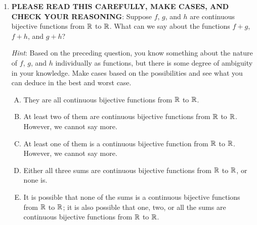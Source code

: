 \documentclass[10pt]{amsart}
\begin{document}
\begin{enumerate}
  \begin{enumerate}[(A)]
  \item $f$ must be an increasing function on all of $\R$.
  \item $f$ must be a decreasing function on all of $\R$.
  \item $f$ must be a constant function on all of $\R$.
  \item $f$ must be either an increasing function on all of $\R$ or a
    decreasing function on all of $\R$, but the information presented
    is insufficient to decide which case occurs.
  \item $f$ must be either an increasing function or a decreasing
    function or a constant function on all of $\R$, but the
    information presented is insufficient for deciding anything
    stronger.
  \end{enumerate}

  {\em Answer}: Option (D)

  {\em Explanation}: This is easy to see pictorially, though a
  rigorous proof would invoke the intermediate value theorem and the
  extreme value theorem.

  {\em Performance review}: 23 out of 27 got this. 4 chose (E).

  {\em Historical note (last time)}: $21$ out of $26$ got this. $5$ chose (E).

\item {\bf PLEASE READ THIS CAREFULLY, MAKE CASES, AND CHECK YOUR
  REASONING}: Suppose $f$, $g$, and $h$ are continuous bijective
  functions from $\R$ to $\R$. What can we say about the functions $f
  + g$, $f + h$, and $g + h$?

  {\em Hint}: Based on the preceding question, you know something
  about the nature of $f$, $g$, and $h$ individually as functions, but
  there is some degree of ambiguity in your knowledge. Make cases
  based on the possibilities and see what you can deduce in the best
  and worst case.

  \begin{enumerate}[(A)]
  \item They are all continuous bijective functions from $\R$ to $\R$.
  \item At least two of them are continuous bijective functions from
    $\R$ to $\R$. However, we cannot say more.
  \item At least one of them is a continuous bijective function from
    $\R$ to $\R$. However, we cannot say more.
  \item Either all three sums are continuous bijective functions from
    $\R$ to $\R$, or none is.
  \item It is possible that none of the sums is a continuous
    bijective functions from $\R$ to $\R$; it is
    also possible that one, two, or all the sums are continuous
    bijective functions from $\R$ to $\R$.
  \end{enumerate}


\end{enumerate}
\end{document}
